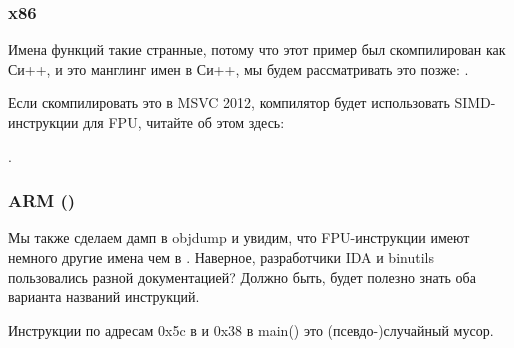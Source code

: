 \subsubsection{x86}



Имена функций такие странные, потому что этот пример был скомпилирован как Си++, и это манглинг имен в Си++, мы будем рассматривать это позже: .

Если скомпилировать это в MSVC 2012, компилятор будет использовать SIMD-инструкции для FPU, читайте об этом здесь:

.

\iffalse
A BUG HERE
\subsubsection{MIPS}



Здесь снова зачем-то добавлена инструкция \INS{LUI}, которая ничего не делает.
Мы уже рассматривали этот артефакт ранее: \myref{MIPS_FPU_LUI}.
\fi

\subsubsection{ARM (\ARMMode)}



Мы также сделаем дамп в objdump и увидим, что FPU-инструкции имеют немного другие имена чем в \IDA.
Наверное, разработчики IDA и binutils пользовались разной документацией?
Должно быть, будет полезно знать оба варианта названий инструкций.



Инструкции по адресам 0x5c в  и 0x38 в main() это (псевдо-)случайный мусор.

